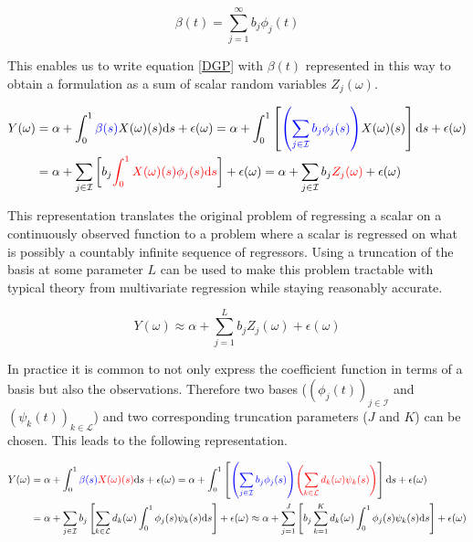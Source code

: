\documentclass[11pt,twoside,a4paper]{article}
\begin{document}
	\begin{equation}
		\beta(t) = \sum_{j = 1}^{\infty} b_j \phi_j(t)
	\end{equation}
	
	This enables us to write equation \ref{DGP} with $\beta(t)$ represented in this way to obtain a formulation as a sum of scalar random variables $Z_j(\omega)$.
	
	\begin{equation}
		\begin{split}
			Y(\omega) & = \alpha + \int_{0}^{1} {\color{blue}\beta(s)} X(\omega)(s)\mathrm{d}s + \epsilon(\omega)
			= \alpha + \int_{0}^{1}\left[{\color{blue}\left(\sum_{j \in \mathcal{I}} b_j \phi_j(s)\right)} X(\omega)(s) \right]\mathrm{d}s + \epsilon(\omega) \\
			& = \alpha + \sum_{j \in \mathcal{I}} \left[b_j \textcolor{red}{\int_{0}^{1} X(\omega)(s) \phi_j(s)\mathrm{d}s}\right] + \epsilon(\omega)
		      = \alpha + \sum_{j \in \mathcal{I}} b_j \textcolor{red}{Z_j(\omega)} + \epsilon(\omega)
		\end{split}
	\end{equation}
	
	This representation translates the original problem of regressing a scalar on a continuously observed function to a problem where a scalar is regressed on what is possibly a countably infinite sequence of regressors. Using a truncation of the basis at some parameter $L$ can be used to make this problem tractable with typical theory from multivariate regression while staying reasonably accurate.
	
	\begin{equation}
			Y(\omega) \approx \alpha + \sum_{j = 1}^{L} b_j Z_j(\omega) + \epsilon(\omega)
	\end{equation}

	In practice it is common to not only express the coefficient function in terms of a basis but also the observations. Therefore two bases ($\left(\phi_j(t)\right)_{j \in \mathcal{I}}$ and $\left(\psi_k(t)\right)_{k \in \mathcal{L}}$) and two corresponding truncation parameters ($J$ and $K$) can be chosen. This leads to the following representation.
	
	\begin{equation}\label{basis_exp_transf}
		\begin{split}
			Y(\omega) & = \alpha + \int_{0}^{1} {\color{blue}\beta(s)} {\color{red}X(\omega)(s)}\mathrm{d}s + \epsilon(\omega)
			 = \alpha + \int_{0}^{1}\left[{\color{blue}\left(\sum_{j \in \mathcal{I}} b_j  \phi_j(s)\right)} {\color{red}\left(\sum_{k \in \mathcal{L}} d_k(\omega)  \psi_k(s)\right)} \right]\mathrm{d}s + \epsilon(\omega) \\
			& = \alpha + \sum_{j \in \mathcal{I}} b_j \left[\sum_{k \in \mathcal{L}} d_k(\omega) \int_{0}^{1} \phi_j(s) \psi_k(s) \mathrm{d}s\right] + \epsilon(\omega) 
			\approx \alpha + \sum_{j = 1}^{J} \left[b_j \sum_{k = 1}^{K}  d_k(\omega) \int_{0}^{1} \phi_j(s) \psi_k(s) \mathrm{d}s\right] + \epsilon(\omega)
		\end{split}
	\end{equation}
\end{document}
